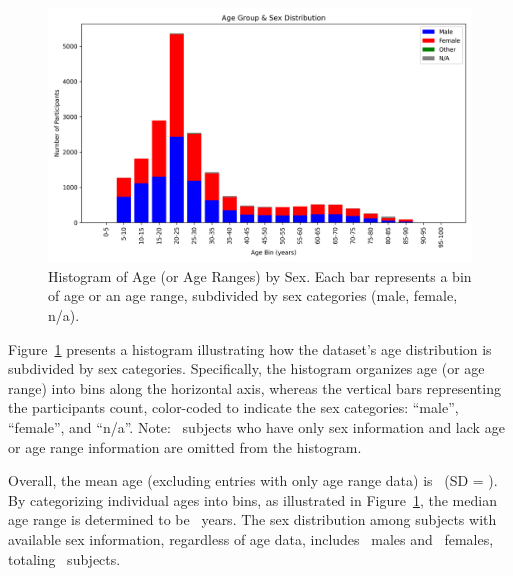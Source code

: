 \begin{figure}[ht]
    \centering
    \includegraphics[width=\linewidth]{figures/age_group_sex_histogram} 
    \caption{Histogram of Age (or Age Ranges) by Sex. Each bar represents a bin of age or an age range, subdivided by sex categories (male, female, n/a).}
    \label{HistogramAgeSexFigure}
\end{figure}

\noindent
Figure~\ref{HistogramAgeSexFigure} presents a histogram illustrating how the dataset's age distribution is subdivided by sex categories. 
Specifically, the histogram organizes age (or age range) into bins along the horizontal axis, whereas the vertical bars 
representing the participants count, color-coded to indicate the sex categories: ``male'', ``female'', and ``n/a''. Note: \TotalSubjectsWithSexCountWithoutAgeInfo\ 
subjects who have only sex information and lack age or age range information are omitted from the histogram.

Overall, the mean age (excluding entries with only age range data) is \TotalSubjectsMeanAgeValue\ (SD = \TotalSubjectsStandardDevAgeValue{}). 
By categorizing individual ages into bins, as illustrated in Figure~\ref{HistogramAgeSexFigure}, the median age range is determined to be \TotalSubjectsMedianAgeGroupValue\ years.
The sex distribution among subjects with available sex information, 
regardless of age data, includes \TotalSubjectsWithMaleSexCount\ males 
and \TotalSubjectsWithFemaleCount\ females, 
totaling \TotalSubjectsWithMalePlusFemaleCount\ subjects. 

